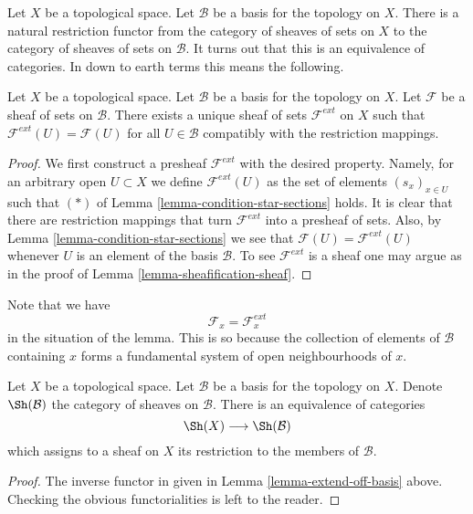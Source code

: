 \noindent
Let $X$ be a topological space.
Let $\mathcal{B}$ be a basis for the topology on $X$.
There is a natural restriction functor from the category
of sheaves of sets on $X$ to the category of sheaves of
sets on $\mathcal{B}$. It turns out that this is an equivalence
of categories. In down to earth terms this means the following.

\begin{lemma}
\label{lemma-extend-off-basis}
Let $X$ be a topological space.
Let $\mathcal{B}$ be a basis for the topology on $X$.
Let $\mathcal{F}$ be a sheaf of sets on $\mathcal{B}$.
There exists a unique sheaf of sets $\mathcal{F}^{ext}$
on $X$ such that $\mathcal{F}^{ext}(U) = \mathcal{F}(U)$
for all $U \in \mathcal{B}$ compatibly with the restriction
mappings.
\end{lemma}

\begin{proof}
We first construct a presheaf $\mathcal{F}^{ext}$ with the
desired property. Namely, for an arbitrary open $U \subset X$ we
define $\mathcal{F}^{ext}(U)$ as the set of elements
$(s_x)_{x \in U}$ such that $(*)$ of
Lemma \ref{lemma-condition-star-sections} holds.
It is clear that there are restriction mappings
that turn $\mathcal{F}^{ext}$ into a presheaf of sets.
Also, by Lemma \ref{lemma-condition-star-sections} we
see that $\mathcal{F}(U) = \mathcal{F}^{ext}(U)$
whenever $U$ is an element of the basis $\mathcal{B}$.
To see $\mathcal{F}^{ext}$ is a sheaf one may
argue as in the proof of Lemma \ref{lemma-sheafification-sheaf}.
\end{proof}

\noindent
Note that we have
$$
\mathcal{F}_x = \mathcal{F}_x^{ext}
$$
in the situation of the lemma. This is so because the
collection of elements of $\mathcal{B}$ containing
$x$ forms a fundamental system of open neighbourhoods of $x$.

\begin{lemma}
\label{lemma-restrict-basis-equivalence}
Let $X$ be a topological space.
Let $\mathcal{B}$ be a basis for the topology on $X$.
Denote $\Sh(\mathcal{B})$ the category of
sheaves on $\mathcal{B}$.
There is an equivalence of categories
$$
\Sh(X) \longrightarrow \Sh(\mathcal{B})
$$
which assigns to a sheaf on $X$ its restriction to
the members of $\mathcal{B}$.
\end{lemma}

\begin{proof}
The inverse functor in given in Lemma \ref{lemma-extend-off-basis} above.
Checking the obvious functorialities is left to the
reader.
\end{proof}

